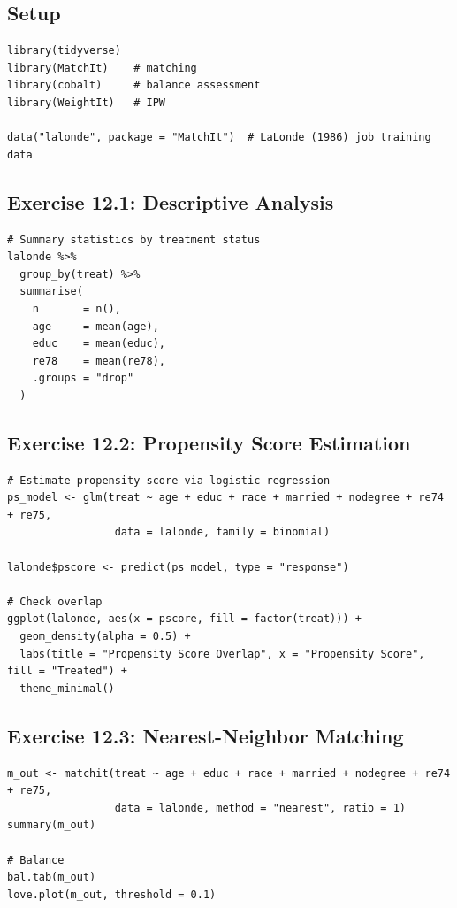 \subsection{Setup}

\begin{lstlisting}
library(tidyverse)
library(MatchIt)    # matching
library(cobalt)     # balance assessment
library(WeightIt)   # IPW

data("lalonde", package = "MatchIt")  # LaLonde (1986) job training data
\end{lstlisting}

\subsection{Exercise 12.1: Descriptive Analysis}

\begin{lstlisting}
# Summary statistics by treatment status
lalonde %>%
  group_by(treat) %>%
  summarise(
    n       = n(),
    age     = mean(age),
    educ    = mean(educ),
    re78    = mean(re78),
    .groups = "drop"
  )
\end{lstlisting}

\subsection{Exercise 12.2: Propensity Score Estimation}

\begin{lstlisting}
# Estimate propensity score via logistic regression
ps_model <- glm(treat ~ age + educ + race + married + nodegree + re74 + re75,
                 data = lalonde, family = binomial)

lalonde$pscore <- predict(ps_model, type = "response")

# Check overlap
ggplot(lalonde, aes(x = pscore, fill = factor(treat))) +
  geom_density(alpha = 0.5) +
  labs(title = "Propensity Score Overlap", x = "Propensity Score", fill = "Treated") +
  theme_minimal()
\end{lstlisting}

\subsection{Exercise 12.3: Nearest-Neighbor Matching}

\begin{lstlisting}
m_out <- matchit(treat ~ age + educ + race + married + nodegree + re74 + re75,
                 data = lalonde, method = "nearest", ratio = 1)
summary(m_out)

# Balance
bal.tab(m_out)
love.plot(m_out, threshold = 0.1)
\end{lstlisting}

